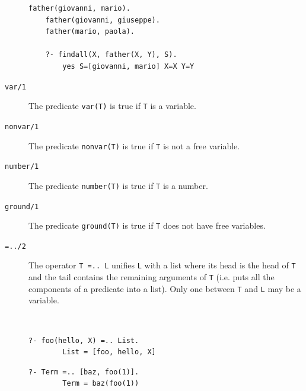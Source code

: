 \begin{description}
        \begin{example} \phantom{}
                \begin{lstlisting}[language={}]
    father(giovanni, mario).
    father(giovanni, giuseppe).
    father(mario, paola).

    ?- findall(X, father(X, Y), S).
        yes S=[giovanni, mario] X=X Y=Y
                \end{lstlisting}   
        \end{example}

    \item[\texttt{var/1}] 
        The predicate \texttt{var(T)} is true if \texttt{T} is a variable.    

    \item[\texttt{nonvar/1}] 
        The predicate \texttt{nonvar(T)} is true if \texttt{T} is not a free variable.    

    \item[\texttt{number/1}] 
        The predicate \texttt{number(T)} is true if \texttt{T} is a number.    

    \item[\texttt{ground/1}] 
        The predicate \texttt{ground(T)} is true if \texttt{T} does not have free variables.    

    \item[\texttt{=../2}] 
        The operator \texttt{T =.. L} unifies \texttt{L} with a list where 
        its head is the head of \texttt{T} and the tail contains the remaining arguments of \texttt{T}
        (i.e. puts all the components of a predicate into a list).
        Only one between \texttt{T} and \texttt{L} may be a variable.

        \begin{example} \phantom{} \\
            \begin{minipage}{0.5\textwidth}
                \begin{lstlisting}[language={}]
    ?- foo(hello, X) =.. List.
        List = [foo, hello, X]
                \end{lstlisting}   
            \end{minipage}
            \begin{minipage}{0.5\textwidth}
                \begin{lstlisting}[language={}]
    ?- Term =.. [baz, foo(1)].
        Term = baz(foo(1))
                \end{lstlisting} 
            \end{minipage}
        \end{example}


\end{description}
